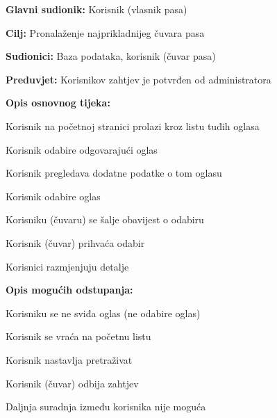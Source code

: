 					\noindent {}
					\begin{packed_item}
						
						\item \textbf{Glavni sudionik: } Korisnik (vlasnik pasa)
						\item  \textbf{Cilj:} Pronalaženje najprikladnijeg čuvara pasa
						\item  \textbf{Sudionici:} Baza podataka, korisnik (čuvar pasa)
						\item  \textbf{Preduvjet:} Korisnikov zahtjev je potvrđen od administratora
						\item  \textbf{Opis osnovnog tijeka:}
						
						\item[] \begin{packed_enum}
							
							\item Korisnik na početnoj stranici prolazi kroz listu tuđih oglasa   
							\item Korisnik odabire odgovarajući oglas
							\item Korisnik pregledava dodatne podatke o tom oglasu
							\item Korisnik odabire oglas 
							\item Korisniku (čuvaru) se šalje obavijest o odabiru
							\item Korisnik (čuvar) prihvaća odabir
							\item Korisnici razmjenjuju detalje
							
						\end{packed_enum}
						
						\item  \textbf{Opis mogućih odstupanja:}
						
						\item[] \begin{packed_item}
							
							\item[4.a] Korisniku se ne sviđa oglas (ne odabire oglas)
							\item[] \begin{packed_enum}
								
								\item Korisnik se vraća na početnu listu
								\item Korisnik nastavlja pretraživat
								
							\end{packed_enum}
						
							\item[6.a] Korisnik (čuvar) odbija zahtjev 
							\item[] \begin{packed_enum}
								
								\item Daljnja suradnja između korisnika nije moguća
								
							\end{packed_enum}
						\end{packed_item}
					\end{packed_item}	

